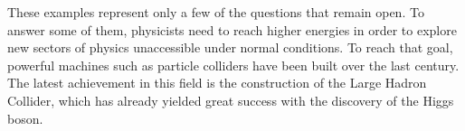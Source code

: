     These examples represent only a few of the questions that remain open. To answer some of them, physicists need to reach higher energies in order to explore new sectors of physics unaccessible under normal conditions. To reach that goal, powerful machines such as particle colliders have been built over the last century. The latest achievement in this field is the construction of the Large Hadron Collider, which has already yielded great success with the discovery of the Higgs boson.
